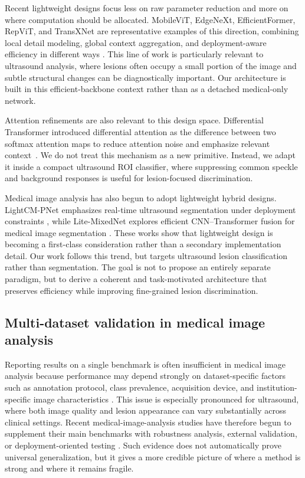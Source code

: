 Recent lightweight designs focus less on raw parameter reduction and more on where computation should be allocated. MobileViT, EdgeNeXt, EfficientFormer, RepViT, and TransXNet are representative examples of this direction, combining local detail modeling, global context aggregation, and deployment-aware efficiency in different ways \cite{mehta2022mobilevit,edgenext,li2022efficientformer,repvit,transxnet}. This line of work is particularly relevant to ultrasound analysis, where lesions often occupy a small portion of the image and subtle structural changes can be diagnostically important. Our architecture is built in this efficient-backbone context rather than as a detached medical-only network.

Attention refinements are also relevant to this design space. Differential Transformer introduced differential attention as the difference between two softmax attention maps to reduce attention noise and emphasize relevant context~\cite{ye2024differential}. We do not treat this mechanism as a new primitive. Instead, we adapt it inside a compact ultrasound ROI classifier, where suppressing common speckle and background responses is useful for lesion-focused discrimination.

Medical image analysis has also begun to adopt lightweight hybrid designs. LightCM-PNet emphasizes real-time ultrasound segmentation under deployment constraints \cite{Wang_2024}, while Lite-MixedNet explores efficient CNN--Transformer fusion for medical image segmentation \cite{Ren_2025}. These works show that lightweight design is becoming a first-class consideration rather than a secondary implementation detail. Our work follows this trend, but targets ultrasound lesion classification rather than segmentation. The goal is not to propose an entirely separate paradigm, but to derive a coherent and task-motivated architecture that preserves efficiency while improving fine-grained lesion discrimination.

\subsection{Multi-dataset validation in medical image analysis}
Reporting results on a single benchmark is often insufficient in medical image analysis because performance may depend strongly on dataset-specific factors such as annotation protocol, class prevalence, acquisition device, and institution-specific image characteristics \cite{litjens2017survey,tajbakhsh2020embracing}. This issue is especially pronounced for ultrasound, where both image quality and lesion appearance can vary substantially across clinical settings. Recent medical-image-analysis studies have therefore begun to supplement their main benchmarks with robustness analysis, external validation, or deployment-oriented testing \cite{Chen_2023,Wang_2024}. Such evidence does not automatically prove universal generalization, but it gives a more credible picture of where a method is strong and where it remains fragile.

